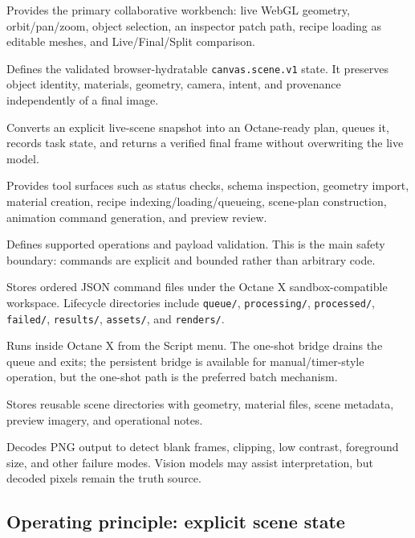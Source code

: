 \documentclass[11pt,a4paper]{article}
\begin{document}
\begin{description}[leftmargin=!,labelwidth=36mm]
  \item[Agentic Canvas] Provides the primary collaborative workbench: live WebGL geometry, orbit/pan/zoom, object selection, an inspector patch path, recipe loading as editable meshes, and Live/Final/Split comparison.
  \item[Canvas scene contract] Defines the validated browser-hydratable \texttt{canvas.scene.v1} state. It preserves object identity, materials, geometry, camera, intent, and provenance independently of a final image.
  \item[Render handoff] Converts an explicit live-scene snapshot into an Octane-ready plan, queues it, records task state, and returns a verified final frame without overwriting the live model.
  \item[Python MCP server] Provides tool surfaces such as status checks, schema inspection, geometry import, material creation, recipe indexing/loading/queueing, scene-plan construction, animation command generation, and preview review.
  \item[Typed command schema] Defines supported operations and payload validation. This is the main safety boundary: commands are explicit and bounded rather than arbitrary code.
  \item[Workspace queue] Stores ordered JSON command files under the Octane X sandbox-compatible workspace. Lifecycle directories include \texttt{queue/}, \texttt{processing/}, \texttt{processed/}, \texttt{failed/}, \texttt{results/}, \texttt{assets/}, and \texttt{renders/}.
  \item[Lua bridge] Runs inside Octane X from the Script menu. The one-shot bridge drains the queue and exits; the persistent bridge is available for manual/timer-style operation, but the one-shot path is the preferred batch mechanism.
  \item[Recipe corpus] Stores reusable scene directories with geometry, material files, scene metadata, preview imagery, and operational notes.
  \item[Review layer] Decodes PNG output to detect blank frames, clipping, low contrast, foreground size, and other failure modes. Vision models may assist interpretation, but decoded pixels remain the truth source.
\end{description}

\subsection{Operating principle: explicit scene state}
\end{document}
